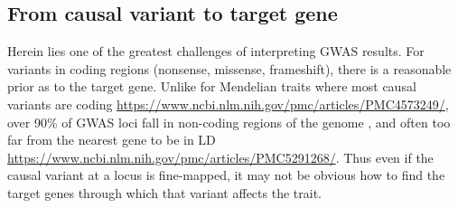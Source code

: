 \begin{outline}
%
%
%
%

\subsection{From causal variant to target gene}

\1 Herein lies one of the greatest challenges of interpreting \gls{GWAS} results.
\1 For variants in coding regions (nonsense, missense, frameshift), there is a reasonable prior as to the target gene.
\1 Unlike for Mendelian traits where most causal variants are coding \url{https://www.ncbi.nlm.nih.gov/pmc/articles/PMC4573249/}, 
over 90\% of \gls{GWAS} loci fall in non-coding regions of the genome \autocite{gallagher2018PostGWASEraAssociation},
and often too far from the nearest gene to be in \gls{LD} \url{https://www.ncbi.nlm.nih.gov/pmc/articles/PMC5291268/}.
Thus even if the causal variant at a locus is fine-mapped, 
it may not be obvious how to find the target genes through which that variant affects the trait.
%


\end{outline}
